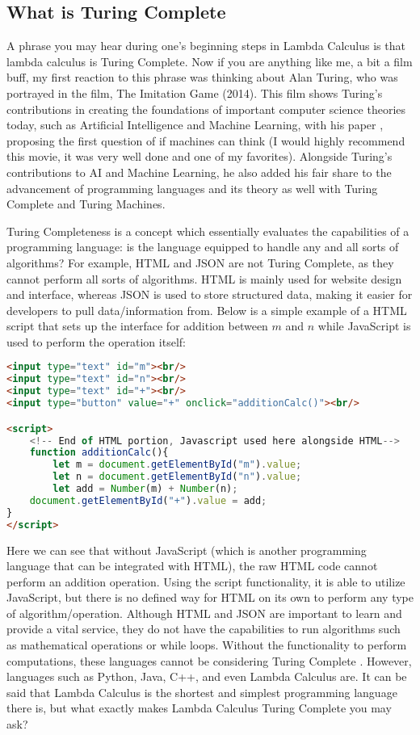 \documentclass{article}
\begin{document}
\subsection{What is Turing Complete}
A phrase you may hear during one's beginning steps in Lambda Calculus is that lambda calculus is Turing Complete. Now if you are anything like me, a bit a film buff, my first reaction to this phrase was thinking about Alan Turing, who was portrayed in the film, The Imitation Game (2014). This film shows Turing's contributions in creating the foundations of important computer science theories today, such as Artificial Intelligence and Machine Learning, with his paper \cite{Computing Machinery and Intelligence}, proposing the first question of if machines can think (I would highly recommend this movie, it was very well done and one of my favorites). Alongside  Turing's contributions to AI and Machine Learning, he also added his fair share to the advancement of programming languages and its theory as well with  Turing Complete and Turing Machines. 

\medskip\noindent
 Turing Completeness is a concept which essentially evaluates the capabilities of a programming language: is the language equipped to handle any and all sorts of algorithms? For example, HTML and JSON are not Turing Complete, as they cannot perform all sorts of algorithms. HTML is mainly used for website design and interface, whereas JSON is used to store structured data, making it easier for developers to pull data/information from. Below is a simple example of a HTML script that sets up the interface for addition between $m$ and $n$ while JavaScript is used to perform the operation itself:
 
 \begin{lstlisting}[language=html] 
<input type="text" id="m"><br/>
<input type="text" id="n"><br/>
<input type="text" id="+"><br/>
<input type="button" value="+" onclick="additionCalc()"><br/>

<script>
    <!-- End of HTML portion, Javascript used here alongside HTML-->
    function additionCalc(){
        let m = document.getElementById("m").value;
        let n = document.getElementById("n").value;
        let add = Number(m) + Number(n);
    document.getElementById("+").value = add;
}
</script>
\end{lstlisting}
 
 \medskip\noindent
 Here we can see that without JavaScript (which is another programming language that can be integrated with HTML), the raw HTML code cannot perform an addition operation. Using the script functionality, it is able to utilize JavaScript, but there is no defined way for HTML on its own to perform any type of algorithm/operation. Although HTML and JSON are important to learn and provide a vital service, they do not have the capabilities to run algorithms such as mathematical operations or while loops. Without the functionality to perform computations, these languages cannot be considering  Turing Complete \cite{TC}. However, languages such as Python, Java, C++, and even Lambda Calculus are. It can be said that Lambda Calculus is the shortest and simplest programming language there is, but what exactly makes Lambda Calculus Turing Complete you may ask? 
\end{document}
